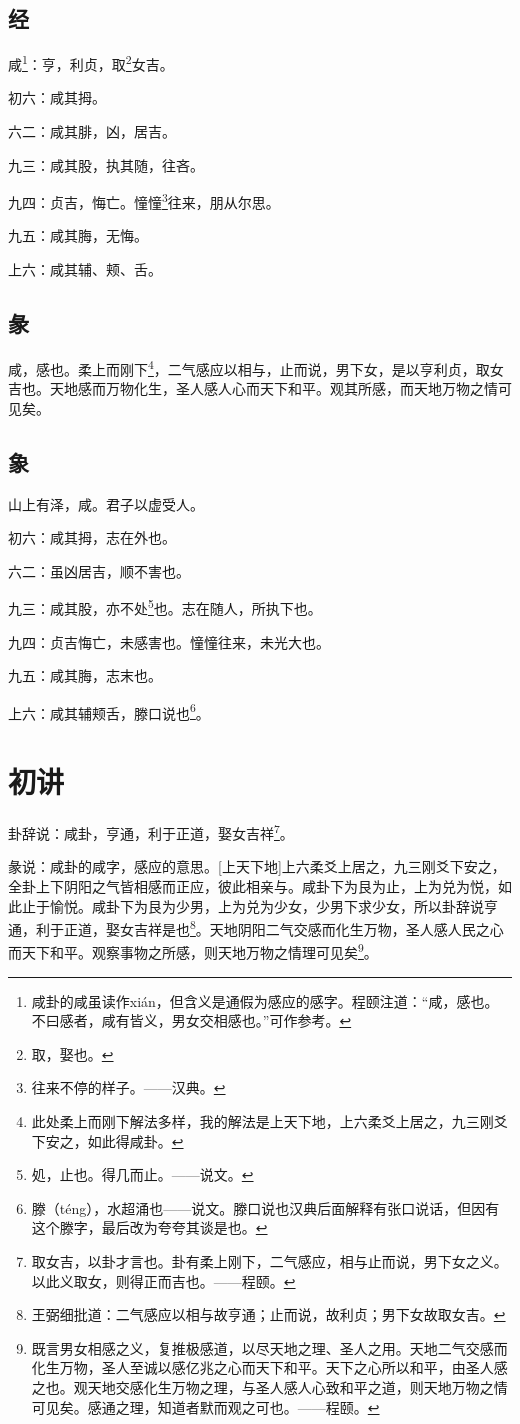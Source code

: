 \documentclass[12pt,oneside]{book}
\begin{document}
\subsection{经}
咸\footnote{咸卦的咸虽读作xián，但含义是通假为感应的感字。程颐注道：“咸，感也。不曰感者，咸有皆义，男女交相感也。”可作参考。}：亨，利贞，取\footnote{取，娶也。}女吉。

初六：咸其拇。

六二：咸其腓，凶，居吉。

九三：咸其股，执其随，往吝。

九四：贞吉，悔亡。憧憧\footnote{往来不停的样子。——汉典。}往来，朋从尔思。

九五：咸其脢，无悔。

上六：咸其辅、颊、舌。

\subsection{彖}
咸，感也。柔上而刚下\footnote{此处柔上而刚下解法多样，我的解法是上天下地，上六柔爻上居之，九三刚爻下安之，如此得咸卦。}，二气感应以相与，止而说，男下女，是以亨利贞，取女吉也。天地感而万物化生，圣人感人心而天下和平。观其所感，而天地万物之情可见矣。

\subsection{象}
山上有泽，咸。君子以虚受人。

初六：咸其拇，志在外也。

六二：虽凶居吉，顺不害也。

九三：咸其股，亦不处\footnote{処，止也。得几而止。——说文。}也。志在随人，所执下也。

九四：贞吉悔亡，未感害也。憧憧往来，未光大也。

九五：咸其脢，志末也。

上六：咸其辅颊舌，滕口说也\footnote{滕（téng），水超涌也——说文。滕口说也汉典后面解释有张口说话，但因有这个滕字，最后改为夸夸其谈是也。}。

\section{初讲}
卦辞说：咸卦，亨通，利于正道，娶女吉祥\footnote{取女吉，以卦才言也。卦有柔上刚下，二气感应，相与止而说，男下女之义。以此义取女，则得正而吉也。——程颐。}。

彖说：咸卦的咸字，感应的意思。[上天下地]上六柔爻上居之，九三刚爻下安之，全卦上下阴阳之气皆相感而正应，彼此相亲与。咸卦下为艮为止，上为兑为悦，如此止于愉悦。咸卦下为艮为少男，上为兑为少女，少男下求少女，所以卦辞说亨通，利于正道，娶女吉祥是也\footnote{王弼细批道：二气感应以相与故亨通；止而说，故利贞；男下女故取女吉。}。天地阴阳二气交感而化生万物，圣人感人民之心而天下和平。观察事物之所感，则天地万物之情理可见矣\footnote{既言男女相感之义，复推极感道，以尽天地之理、圣人之用。天地二气交感而化生万物，圣人至诚以感亿兆之心而天下和平。天下之心所以和平，由圣人感之也。观天地交感化生万物之理，与圣人感人心致和平之道，则天地万物之情可见矣。感通之理，知道者默而观之可也。——程颐。}。
\end{document}
